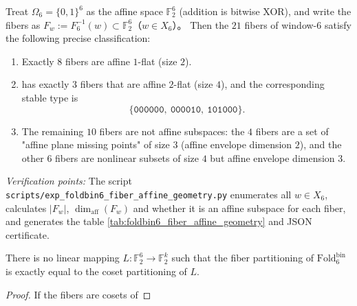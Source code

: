 \begin{enumerate}
\begin{theorem}\label{thm:terminal-foldbin6-fiber-affine-geometry}Treat \(\Omega_6=\{0,1\}^6\) as the affine space \(\mathbb{F}_2^6\) (addition is bitwise XOR), and write the fibers as  \(F_w:=F_6^{-1}(w)\subset \mathbb{F}_2^6\)（\(w\in X_6\)）。
Then the \(21\) fibers of window-\(6\) satisfy the following precise classification:  \begin{enumerate}
\item Exactly \(8\) fibers are affine \(1\)-flat (size \(2\)).\item has exactly \(3\) fibers that are affine \(2\)-flat (size \(4\)), and the corresponding stable type is    \[
    \{\texttt{000000},\ \texttt{000010},\ \texttt{101000}\}.
    \]
\item The remaining \(10\) fibers are not affine subspaces: the \(4\) fibers are a set of "affine plane missing points" of size \(3\) (affine envelope dimension \(2\)), and the other \(6\) fibers are nonlinear subsets of size \(4\) but affine envelope dimension \(3\).  \end{enumerate}
\emph{Verification points:} The script \texttt{scripts/exp\_foldbin6\_fiber\_affine\_geometry.py} enumerates all \(w\in X_6\), calculates \(|F_w|\), \(\dim_{\mathrm{aff}}(F_w)\) and whether it is an affine subspace for each fiber, and generates the table \ref{tab:foldbin6_fiber_affine_geometry} and JSON certificate.  \end{theorem}
  

\begin{corollary}  \label{cor:terminal-foldbin6-no-linear-kernel}There is no linear mapping \(L:\mathbb{F}_2^6\to \mathbb{F}_2^k\) such that the fiber partitioning of \(\mathrm{Fold}^{\mathrm{bin}}_6\) is exactly equal to the coset partitioning of \(L\).  \begin{proof}
If the fibers are cosets of  \end{proof}
  \end{corollary}


\end{enumerate}
